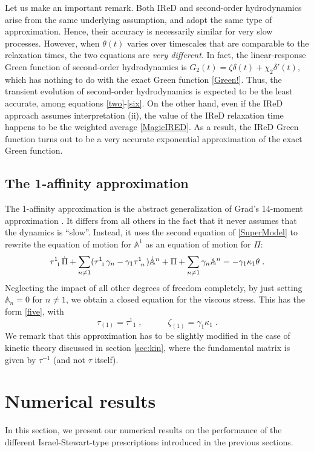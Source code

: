 \documentclass[a4paper, amsfonts, amssymb, amsmath, reprint, showkeys, nofootinbib, twoside, onecolumn,notitlepage]{revtex4-2}
\newcommand{\A}{\mathbb{A}}
\begin{document}
Let us make an important remark. Both IReD and second-order hydrodynamics arise from the same underlying assumption, and adopt the same type of approximation. Hence, their accuracy is necessarily similar for very slow processes. However, when $\theta(t)$ varies over timescales that are comparable to the relaxation times, the two equations are \textit{very different}. In fact, the linear-response Green function of second-order hydrodynamics is $G_2(t){=}\zeta \delta(t){+}\chi_2 \delta'(t)$, which has nothing to do with the exact Green function \eqref{Green!}. Thus, the transient evolution of second-order hydrodynamics is expected to be the least accurate, among equations \eqref{two}-\eqref{six}. On the other hand, even if the IReD approach assumes interpretation (ii), the value of the IReD relaxation time happens to be the weighted average \eqref{MagicIRED}. As a result, the IReD Green function turns out to be a very accurate exponential approximation of the exact Green function. 



\subsection{The 1-affinity approximation}
\label{sec:1AA}
The 1-affinity approximation is the abstract generalization of Grad's 14-moment approximation \cite{Israel_Stewart_1979}. It differs from all others in the fact that it never assumes that the dynamics is ``slow''. Instead, it uses the second equation of \eqref{SuperModel} to rewrite the equation of motion for $\A^1$ as an equation of motion for $\Pi$:
\begin{equation}
    \tau\indices{^1 _1} \dot{\Pi}+\sum_{n \neq 1} (\tau\indices{^1 _1} \gamma_n -\gamma_1 \tau\indices{^1 _n})\dot{\A}^n+\Pi+\sum_{n\neq 1} \gamma_n \A^n=-\gamma_1 \kappa_1 \theta \;.
\end{equation}
Neglecting the impact of all other degrees of freedom completely, by just setting $\A_n=0$ for $n\neq 1$, we obtain a closed equation for the viscous stress. This has the form \eqref{five}, with
\begin{equation}
    \tau_{(1)}=\tau^1{}_{1}\;, \quad \quad \quad  
    \zeta_{(1)}=\gamma_1\kappa_1\;.
\end{equation}
We remark that this approximation has to be slightly modified in the case of kinetic theory discussed in section \ref{sec:kin}, where the fundamental matrix is given by $\tau^{-1}$ (and not $\tau$ itself). 

\section{Numerical results}
In this section, we present our numerical results on the performance of the different Israel-Stewart-type prescriptions introduced in the previous sections.
\end{document}
